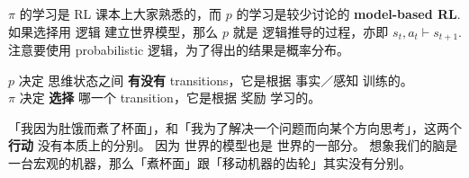 \begin{preview}
\begin{minipage}{\textwidth}
$\pi$ 的学习是 RL 课本上大家熟悉的，而 $p$ 的学习是较少讨论的 \textbf{model-based RL}.  如果选择用 逻辑 建立世界模型，那么 $p$ 就是 逻辑推导的过程，亦即 $s_t, a_t \vdash s_{t+1}$.  注意要使用 probabilistic 逻辑，为了得出的结果是概率分布。

$p$ 决定 思维状态之间 \textbf{有没有} transitions，它是根据 事实／感知 训练的。 \\
$\pi$ 决定 \textbf{选择} 哪一个 transition，它是根据 奖励 学习的。 

「我因为肚饿而煮了杯面」，和「我为了解决一个问题而向某个方向思考」，这两个 \textbf{行动} 没有本质上的分别。 因为 世界的模型也是 世界的一部分。 想象我们的脑是一台宏观的机器，那么「煮杯面」跟「移动机器的齿轮」其实没有分别。

\end{minipage}
\end{preview}

